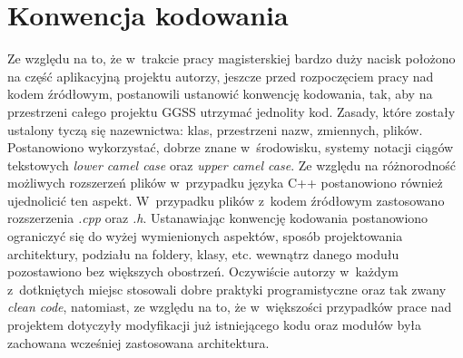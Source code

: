 \section{Konwencja kodowania}
Ze względu na to, że w~trakcie pracy magisterskiej bardzo duży nacisk położono na część aplikacyjną projektu autorzy, jeszcze przed rozpoczęciem pracy nad kodem źródłowym, postanowili ustanowić konwencję kodowania, tak, aby na przestrzeni całego projektu GGSS utrzymać jednolity kod. Zasady, które zostały ustalony tyczą się nazewnictwa: klas, przestrzeni nazw, zmiennych, plików. Postanowiono wykorzystać, dobrze znane w~środowisku, systemy notacji ciągów tekstowych \emph{lower camel case} oraz \emph{upper camel case}. Ze względu na różnorodność możliwych rozszerzeń plików w~przypadku języka C++ postanowiono również ujednolicić ten aspekt. W~przypadku plików z~kodem źródłowym zastosowano rozszerzenia \emph{.cpp} oraz \emph{.h}. Ustanawiając konwencję kodowania postanowiono ograniczyć się do wyżej wymienionych aspektów, sposób projektowania architektury, podziału na foldery, klasy, etc. wewnątrz danego modułu pozostawiono bez większych obostrzeń. Oczywiście autorzy w~każdym z~dotkniętych miejsc stosowali dobre praktyki programistyczne oraz tak zwany \emph{clean code}, natomiast, ze względu na to, że w~większości przypadków prace nad projektem dotyczyły modyfikacji już istniejącego kodu oraz modułów była zachowana wcześniej zastosowana architektura.

